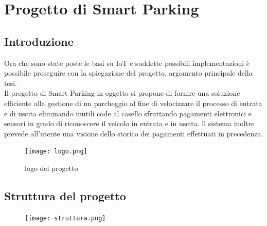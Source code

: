 \documentclass[a4paper,titlepage]{report}
\begin{document}
\chapter{Progetto di Smart Parking}
\section{Introduzione}
Ora che sono state poste le basi su IoT e suddette possibili implementazioni è possibile proseguire con la spiegazione del progetto, argomento principale della tesi.\\
Il progetto di Smart Parking in oggetto si propone di fornire una soluzione efficiente alla gestione di un parcheggio al fine di velocizzare il processo di entrata e di uscita eliminando inutili code al casello sfruttando pagamenti elettronici e sensori in grado di riconoscere il veicolo in entrata e in uscita. ll sistema inoltre prevede all'utente una visione dello storico dei pagamenti effettuati in precedenza.

\begin{figure}[h]
\centering
\texttt{[image: logo.png]}
\caption{logo del progetto}
\end{figure}

\newpage
\section{Struttura del progetto}
\begin{figure}[h]
\centering
\texttt{[image: struttura.png]}
\end{figure}
\newpage
\end{document}
